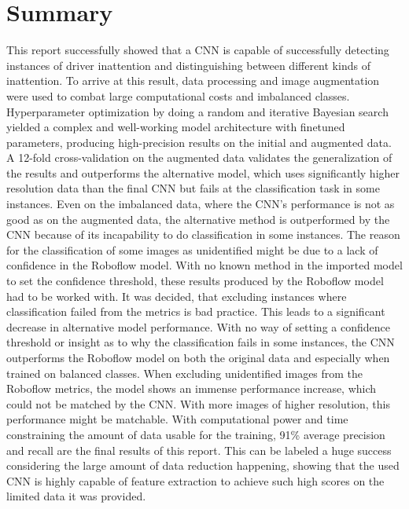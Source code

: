 \newpage
\section{Summary}
This report successfully showed that a CNN is capable of successfully detecting instances of driver inattention and distinguishing between different kinds of inattention. 
To arrive at this result, data processing and image augmentation were used to combat large computational costs and imbalanced classes. Hyperparameter optimization by doing a random and iterative Bayesian search yielded a complex and well-working model architecture with finetuned parameters, producing high-precision results on the initial and augmented data. A 12-fold cross-validation on the augmented data validates the generalization of the results and outperforms the alternative model, which uses significantly higher resolution data than the final CNN but fails at the classification task in some instances. Even on the imbalanced data, where the CNN's performance is not as good as on the augmented data, the alternative method is outperformed by the CNN because of its incapability to do classification in some instances.
The reason for the classification of some images as unidentified might be due to a lack of confidence in the Roboflow model. With no known method in the imported model to set the confidence threshold, these results produced by the Roboflow model had to be worked with. It was decided, that excluding instances where classification failed from the metrics is bad practice. This leads to a significant decrease in alternative model performance. With no way of setting a confidence threshold or insight as to why the classification fails in some instances, the CNN outperforms the Roboflow model on both the original data and especially when trained on balanced classes. When excluding unidentified images from the Roboflow metrics, the model shows an immense performance increase, which could not be matched by the CNN. With more images of higher resolution, this performance might be matchable. With computational power and time constraining the amount of data usable for the training, 91\% average precision and recall are the final results of this report. This can be labeled a huge success considering the large amount of data reduction happening, showing that the used CNN is highly capable of feature extraction to achieve such high scores on the limited data it was provided.